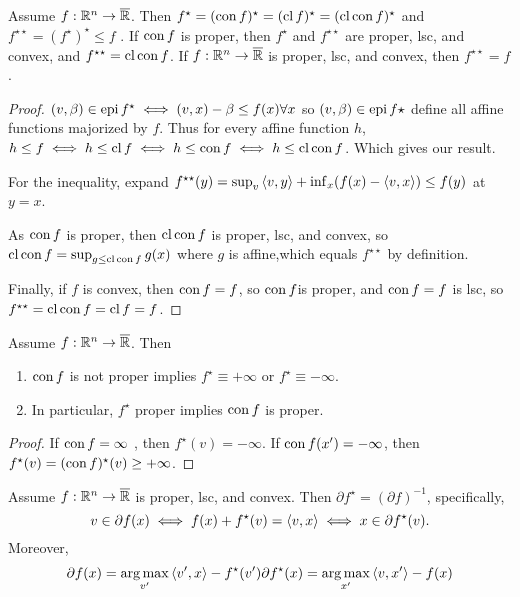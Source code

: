 \begin{thm}
  \label{sec:conjugate-functions-7}
  Assume $f: \mathbb{R}^{n} \rightarrow \overline {\mathbb{R}}$.  Then $f^{\star} =
  (\operatorname*{con} f)^{\star} = (\operatorname*{cl} f)^{\star} = (\operatorname*{cl} \operatorname*{con} f)^{\star}$ and
  $f^{\star \star} = (f^{\star})^{\star} \leq f$ .  If $\operatorname*{con} f$ is
  proper, then $f^{\star}$ and $f^{\star \star}$ are proper, lsc, and
  convex, and $f^{\star \star} = \operatorname*{cl} \operatorname*{con} f$.  If $f: \mathbb{R}^{n}
  \rightarrow \overline {\mathbb{R}}$ is proper, lsc, and convex, then $f^{\star
  \star} = f$.
\end{thm}

\begin{proof}
  $(v, \beta) \in \operatorname*{epi} f^{\star} \iff (v, x) - \beta \leq f(x) \forall
  x$ so $(v, \beta) \in \operatorname*{epi} f\star$ define all affine functions
  majorized by $f$.  Thus for every affine function $h$, $h \leq f
  \iff h \leq \operatorname*{cl} f \iff h \leq \operatorname*{con} f \iff h \leq \operatorname*{cl} \operatorname*{con} f$.  Which
  gives our result.

  For the inequality, expand $f^{\star \star}(y) = \sup_{v} \IP{v, y} +
  \inf_{x}( f(x) - \IP{v, x}) \leq f(y)$ at $y = x$.

  As $\operatorname*{con} f$ is proper, then $\operatorname*{cl} \operatorname*{con} f$ is proper, lsc, and
  convex, so $\operatorname*{cl} \operatorname*{con} f = \sup_{g \leq \operatorname*{cl} \operatorname*{con} f} g(x)$ where $g$ is
  affine,which equals $f^{\star \star}$ by definition.

  Finally, if $f$ is convex, then $\operatorname*{con} f = f$, so $\operatorname*{con} f$is proper,
  and $\operatorname*{con} f = f$ is lsc, so $f^{\star \star} = \operatorname*{cl} \operatorname*{con} f = \operatorname*{cl} f = f$.
\end{proof}

\begin{thm}
  \label{sec:conjugate-functions-8}
  Assume $f: \mathbb{R}^{n} \rightarrow \overline {\mathbb{R}}$.  Then
  \begin{enumerate}
  \item $\operatorname*{con} f$ is not proper implies $f^{\star} \equiv +\infty$ or
    $f^{\star} \equiv -\infty$.
  \item In particular, $f^{\star}$ proper implies $\operatorname*{con} f$ is proper.
  \end{enumerate}
\end{thm}

\begin{proof}
  If $\operatorname*{con} f = \infty$ , then $f^{\star} (v) = -\infty$.  If $\operatorname*{con}
  f(x') = -\infty$, then $f^{\star}(v) = (\operatorname*{con} f)^{\star}(v) \geq +\infty$.
\end{proof}

\begin{thm}
  \label{sec:conjugate-functions-9}
  Assume $f: \mathbb{R}^{n} \rightarrow \overline {\mathbb{R}}$ is proper, lsc, and
  convex.  Then $\partial f^{\star} = (\partial f)^{-1}$,
  specifically,
  \begin{equation}
    \label{eq:20}
    v \in \partial f(x) \iff f(x) + f^{\star}(v) = \IP{v, x} \iff x
    \in \partial f^{\star}(v).
  \end{equation}
  Moreover,
  \begin{align}
    \label{eq:22}
    \partial f(x) = \argmax_{v'} \IP{v', x} - f^{\star}(v')
    \partial f^{\star}(x) = \argmax_{x'} \IP{v, x'} - f(x)
  \end{align}
\end{thm}


